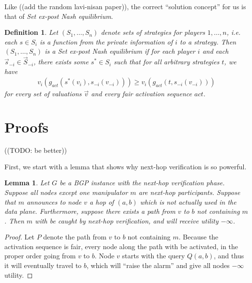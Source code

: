 \documentclass[12pt]{article}
\newtheorem{definition}{Definition}
\newtheorem{lemma}{Lemma}
\begin{document}

  Like \cite{Attraction} ((add the random lavi-nisan paper)),
  the correct ``solution concept'' for us is that of \emph{Set ex-post
  Nash equilibrium}.
  \begin{definition}
    Let $(S_1, \ldots, S_n)$ denote sets of strategies for players $1,\ldots,n$,
    i.e. each $s\in S_i$ is a function from the private information of $i$
    to a strategy.
    Then $(S_1, \ldots, S_n)$ is a \emph{Set ex-post Nash equilibrium} if
    for each player $i$ and each $\vec s _{-i} \in \vec S_{-i}$,
    there exists some $s^* \in S_i$ such that
    for \emph{all arbitrary strategies} $t$, we have
    \begin{align*}
      v_i( g_{act}( s^*(v_i), s_{-i}(v_{-i}) ) )
      \ge v_i( g_{act}( t, s_{-i}(v_{-i}) ) )
    \end{align*}
    for every set of valuations $\vec v$ and every fair activation sequence $act$.
  \end{definition}


\section{Proofs}
  ((TODO: be better))

  First, we start with a lemma that shows why next-hop verification is so
  powerful.
  \begin{lemma}
    Let $G$ be a BGP instance with the next-hop verification phase.
    Suppose all nodes except one manipulator $m$ are next-hop participants.
    Suppose that $m$ announces to node $v$ a hop of $(a,b)$
    which is not actually used in the data plane.
    Furthermore, suppose there exists a path from $v$ to $b$ not containing $m$.
    Then $m$ with be caught by next-hop verification, and will
    receive utility $-\infty$.
  \end{lemma}
  \begin{proof}
    Let $P$ denote the path from $v$ to $b$ not containing $m$.
    Because the activation sequence is fair, every node along the path with
    be activated, in the proper order going from $v$ to $b$.
    Node $v$ starts with the query $Q(a,b)$, and thus it will eventually travel
    to $b$, which will ``raise the alarm'' and give all nodes $-\infty$ utility.
  \end{proof}
\end{document}

